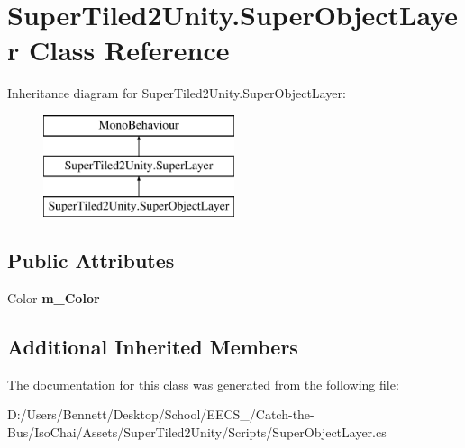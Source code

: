 \hypertarget{class_super_tiled2_unity_1_1_super_object_layer}{}\section{Super\+Tiled2\+Unity.\+Super\+Object\+Layer Class Reference}
\label{class_super_tiled2_unity_1_1_super_object_layer}
Inheritance diagram for Super\+Tiled2\+Unity.\+Super\+Object\+Layer\+:\begin{figure}[H]
\begin{center}
\leavevmode
\includegraphics[height=3.000000cm]{class_super_tiled2_unity_1_1_super_object_layer}
\end{center}
\end{figure}
\subsection*{Public Attributes}
\begin{DoxyCompactItemize}
\item 
\mbox{\label{class_super_tiled2_unity_1_1_super_object_layer_ad10145f4dcfadd4177adb022a6a9c113}} 
Color {\bfseries m\+\_\+\+Color}
\end{DoxyCompactItemize}
\subsection*{Additional Inherited Members}


The documentation for this class was generated from the following file\+:\begin{DoxyCompactItemize}
\item 
D\+:/\+Users/\+Bennett/\+Desktop/\+School/\+E\+E\+C\+S\+\_/\+Catch-\/the-\/\+Bus/\+Iso\+Chai/\+Assets/\+Super\+Tiled2\+Unity/\+Scripts/Super\+Object\+Layer.\+cs\end{DoxyCompactItemize}
